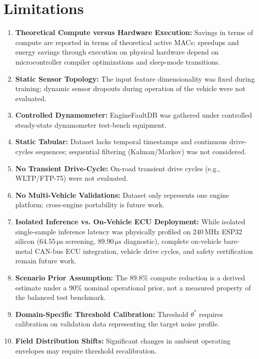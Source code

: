 \documentclass[journal]{IEEEtran}
\begin{document}
\section{Limitations}
\begin{enumerate}
    \item \textbf{Theoretical Compute versus Hardware Execution:} Savings in terms of compute are reported in terms of theoretical active MACs; speedups and energy savings through execution on physical hardware depend on microcontroller compiler optimizations and sleep-mode transitions.
    \item \textbf{Static Sensor Topology:} The input feature dimensionality was fixed during training; dynamic sensor dropouts during operation of the vehicle were not evaluated.
    \item \textbf{Controlled Dynamometer:} EngineFaultDB was gathered under controlled steady-state dynamometer test-bench equipment.
    \item \textbf{Static Tabular:} Dataset lacks temporal timestamps and continuous drive-cycles sequences; sequential filtering (Kalman/Markov) was not considered.
    \item \textbf{No Transient Drive-Cycle:} On-road transient drive cycles (e.g., WLTP/FTP-75) were not evaluated.
    \item \textbf{No Multi-Vehicle Validations:} Dataset only represents one engine platform; cross-engine portability is future work.
    \item \textbf{Isolated Inference vs. On-Vehicle ECU Deployment:} While isolated single-sample inference latency was physically profiled on 240\,MHz ESP32 silicon ($64.55\,\si{\micro\second}$ screening, $89.90\,\si{\micro\second}$ diagnostic), complete on-vehicle bare-metal CAN-bus ECU integration, vehicle drive cycles, and safety certification remain future work.
    \item \textbf{Scenario Prior Assumption:} The $89.8\%$ compute reduction is a derived estimate under a $90\%$ nominal operational prior, not a measured property of the balanced test benchmark.
    \item \textbf{Domain-Specific Threshold Calibration:} Threshold $\theta^*$ requires calibration on validation data representing the target noise profile.
    \item \textbf{Field Distribution Shifts:} Significant changes in ambient operating envelopes may require threshold recalibration.
\end{enumerate}
\end{document}
